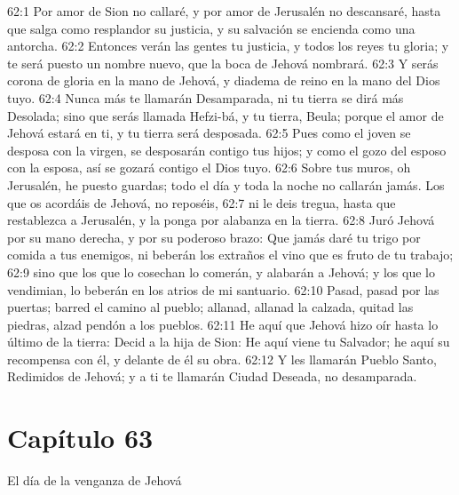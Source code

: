 62:1 Por amor de Sion no callaré, y por amor de Jerusalén no descansaré, hasta que salga como resplandor su justicia, y su salvación se encienda como una antorcha. 
62:2 Entonces verán las gentes tu justicia, y todos los reyes tu gloria; y te será puesto un nombre nuevo, que la boca de Jehová nombrará. 
62:3 Y serás corona de gloria en la mano de Jehová, y diadema de reino en la mano del Dios tuyo. 
62:4 Nunca más te llamarán Desamparada, ni tu tierra se dirá más Desolada; sino que serás llamada Hefzi-bá, y tu tierra, Beula; porque el amor de Jehová estará en ti, y tu tierra será desposada. 
62:5 Pues como el joven se desposa con la virgen, se desposarán contigo tus hijos; y como el gozo del esposo con la esposa, así se gozará contigo el Dios tuyo. 
62:6 Sobre tus muros, oh Jerusalén, he puesto guardas; todo el día y toda la noche no callarán jamás. Los que os acordáis de Jehová, no reposéis, 
62:7 ni le deis tregua, hasta que restablezca a Jerusalén, y la ponga por alabanza en la tierra. 
62:8 Juró Jehová por su mano derecha, y por su poderoso brazo: Que jamás daré tu trigo por comida a tus enemigos, ni beberán los extraños el vino que es fruto de tu trabajo; 
62:9 sino que los que lo cosechan lo comerán, y alabarán a Jehová; y los que lo vendimian, lo beberán en los atrios de mi santuario. 
62:10 Pasad, pasad por las puertas; barred el camino al pueblo; allanad, allanad la calzada, quitad las piedras, alzad pendón a los pueblos. 
62:11 He aquí que Jehová hizo oír hasta lo último de la tierra: Decid a la hija de Sion: He aquí viene tu Salvador; he aquí su recompensa con él, y delante de él su obra. 
62:12 Y les llamarán Pueblo Santo, Redimidos de Jehová; y a ti te llamarán Ciudad Deseada, no desamparada. 
\section*{Capítulo 63 }
El día de la venganza de Jehová 
 
